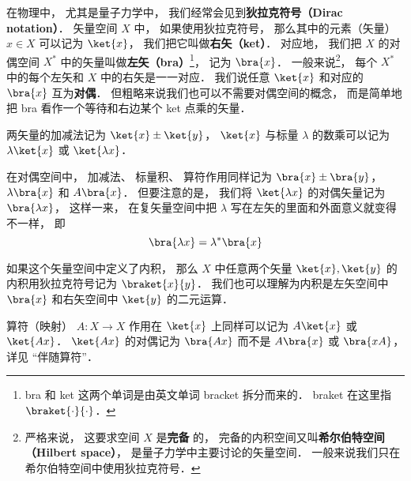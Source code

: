 

在物理中， 尤其是量子力学中， 我们经常会见到\textbf{狄拉克符号（Dirac notation）}． 矢量空间 $X$ 中， 如果使用狄拉克符号， 那么其中的元素（矢量） $x\in X$ 可以记为 $\ket{x}$， 我们把它叫做\textbf{右矢（ket）}． 对应地， 我们把 $X$ 的对偶空间 $X^*$ 中的矢量叫做\textbf{左矢（bra）}\footnote{bra 和 ket 这两个单词是由英文单词 bracket 拆分而来的． braket 在这里指 $\braket{\cdot}{\cdot}$．}， 记为 $\bra{x}$． 一般来说\footnote{严格来说， 这要求空间 $X$ 是\textbf{完备}%
的， 完备的内积空间又叫\textbf{希尔伯特空间（Hilbert space）}， 是量子力学中主要讨论的矢量空间． 一般来说我们只在希尔伯特空间中使用狄拉克符号．}， 每个 $X^*$ 中的每个左矢和 $X$ 中的右矢是一一对应． 我们说任意 $\ket{x}$ 和对应的 $\bra{x}$ 互为\textbf{对偶}． 但粗略来说我们也可以不需要对偶空间的概念， 而是简单地把 bra 看作一个等待和右边某个 ket 点乘的矢量．

两矢量的加减法记为 $\ket{x} \pm \ket{y}$， $\ket{x}$ 与标量 $\lambda$ 的数乘可以记为 $\lambda\ket{x}$ 或 $\ket{\lambda x}$．

在对偶空间中， 加减法、 标量积、 算符作用同样记为 $\bra{x} \pm \bra{y}$， $\lambda\bra{x}$ 和 $A\bra{x}$． 但要注意的是， 我们将 $\ket{\lambda x}$ 的对偶矢量记为 $\bra{\lambda x}$， 这样一来， 在复矢量空间中把 $\lambda$ 写在左矢的里面和外面意义就变得不一样， 即 %
\begin{equation}
\bra{\lambda x} = \lambda^* \bra{x}
\end{equation}

如果这个矢量空间中定义了内积， 那么 $X$ 中任意两个矢量 $\ket{x}, \ket{y}$ 的内积用狄拉克符号记为 $\braket{x}{y}$． 我们也可以理解为内积是左矢空间中 $\bra{x}$ 和右矢空间中 $\ket{y}$ 的二元运算．

算符（映射） $A:X\to X$ 作用在 $\ket{x}$ 上同样可以记为 $A\ket{x}$ 或 $\ket{Ax}$． $\ket{Ax}$ 的对偶记为 $\bra{Ax}$ 而不是 $A\bra{x}$ 或 $\bra{xA}$， 详见 “伴随算符”．

